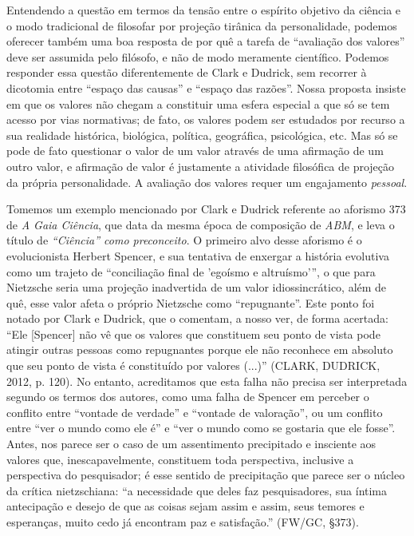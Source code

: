 \documentclass[
	12pt,				%
	openright,			%
	oneside,			%
	a4paper,			%
	english,			%
	french,				%
	spanish,			%
	brazil				%
	]{abntex2}
\begin{document}
Entendendo a questão em termos da tensão entre o espírito objetivo da ciência e o modo tradicional de filosofar por projeção tirânica da personalidade, podemos oferecer também uma boa resposta de por quê a tarefa de “avaliação dos valores” deve ser assumida pelo filósofo, e não de modo meramente científico. Podemos responder essa questão diferentemente de Clark e Dudrick, sem recorrer à dicotomia entre “espaço das causas” e “espaço das razões”. Nossa proposta insiste em que os valores não chegam a constituir uma esfera especial a que só se tem acesso por vias normativas; de fato, os valores podem ser estudados por recurso a sua realidade histórica, biológica, política, geográfica, psicológica, etc. Mas só se pode de fato questionar o valor de um valor através de uma afirmação de um outro valor, e afirmação de valor é justamente a atividade filosófica de projeção da própria personalidade. A avaliação dos valores requer um engajamento \textit{pessoal}. 

	Tomemos um exemplo mencionado por Clark e Dudrick referente ao aforismo 373 de \textit{A Gaia Ciência}, que data da mesma época de composição de \textit{ABM}, e leva o título de \textit{“Ciência” como preconceito}. O primeiro alvo desse aforismo é o evolucionista Herbert Spencer, e sua tentativa de enxergar a história evolutiva como um trajeto de “conciliação final de 'egoísmo e altruísmo'”, o que para Nietzsche seria uma projeção inadvertida de um valor idiossincrático, além de quê, esse valor afeta o próprio Nietzsche como “repugnante”. Este ponto foi notado por Clark e Dudrick, que o comentam, a nosso ver, de forma acertada: “Ele [Spencer] não vê que os valores que constituem seu ponto de vista pode atingir outras pessoas como repugnantes porque ele não reconhece em absoluto que seu ponto de vista é constituído por valores (...)” (CLARK, DUDRICK, 2012, p. 120). No entanto, acreditamos que esta falha não precisa ser interpretada segundo os termos dos autores, como uma falha de Spencer em perceber o conflito entre “vontade de verdade” e “vontade de valoração”, ou um conflito entre “ver o mundo como ele é” e “ver o mundo como se gostaria que ele fosse”. Antes, nos parece ser o caso de um assentimento precipitado e insciente aos valores que, inescapavelmente, constituem toda perspectiva, inclusive a perspectiva do pesquisador; é esse sentido de precipitação que parece ser o núcleo da crítica nietzschiana: “a necessidade que deles faz pesquisadores, sua íntima antecipação e desejo de que as coisas sejam assim e assim, seus temores e esperanças, muito cedo já encontram paz e satisfação.” (FW/GC, §373).
	
\end{document}
